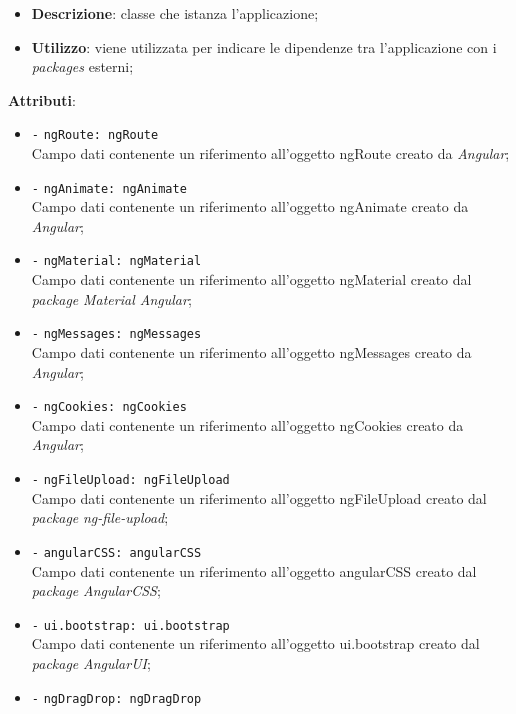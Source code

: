 		\begin{itemize}
			\item \textbf{Descrizione}: classe che istanza l'applicazione;
			\item \textbf{Utilizzo}: viene utilizzata per indicare le dipendenze tra l'applicazione con i \textit{packages} esterni;
			\end{itemize}
			\item \textbf{Attributi}: 
			\begin{itemize}
				\item \texttt{-} \texttt{ngRoute: ngRoute} \\
				Campo dati contenente un riferimento all'oggetto ngRoute creato da \textit{Angular};
				\item \texttt{-} \texttt{ngAnimate: ngAnimate} \\
				Campo dati contenente un riferimento all'oggetto ngAnimate creato da \textit{Angular};
				\item \texttt{-} \texttt{ngMaterial: ngMaterial} \\
				Campo dati contenente un riferimento all'oggetto ngMaterial creato dal \textit{package} \textit{Material Angular};
				\item \texttt{-} \texttt{ngMessages: ngMessages} \\
				Campo dati contenente un riferimento all'oggetto ngMessages creato da \textit{Angular};
				\item \texttt{-} \texttt{ngCookies: ngCookies} \\
				Campo dati contenente un riferimento all'oggetto ngCookies creato da \textit{Angular};
				\item \texttt{-} \texttt{ngFileUpload: ngFileUpload} \\
				Campo dati contenente un riferimento all'oggetto ngFileUpload creato dal \textit{package} \textit{ng-file-upload};
				\item \texttt{-} \texttt{angularCSS: angularCSS} \\
				Campo dati contenente un riferimento all'oggetto angularCSS creato dal \textit{package} \textit{AngularCSS};
				\item \texttt{-} \texttt{ui.bootstrap: ui.bootstrap} \\
				Campo dati contenente un riferimento all'oggetto ui.bootstrap creato dal \textit{package} \textit{AngularUI};
				\item \texttt{-} \texttt{ngDragDrop: ngDragDrop} \\

\end{itemize}

